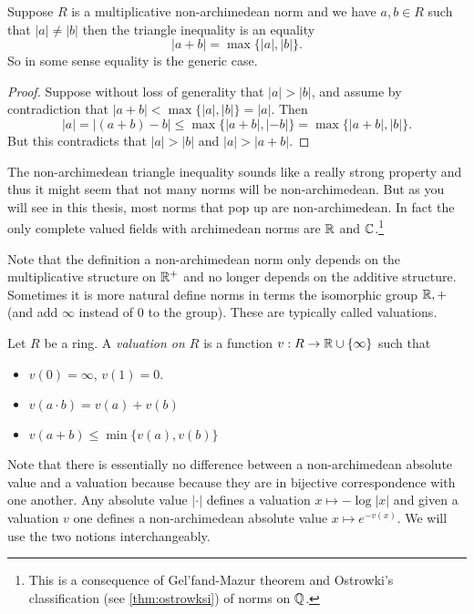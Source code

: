 \begin{remark}
	Suppose $R$ is a multiplicative non-archimedean norm and we have $a, b \in R$ such that $|a| \ne |b|$ then the triangle inequality is an equality \[
	|a + b| = \max \{|a|, |b|\} 
	.\] 
	So in some sense equality is the generic case. 
\end{remark}
\begin{proof}
	Suppose without loss of generality that  $|a| > |b|$, and assume by contradiction that $|a + b| < \max \{|a|, |b|\}  = |a|$. 
	Then \[
		|a| = |(a + b) - b| \le \max \{|a + b|, |- b|\} = \max \{|a + b|, |b|\}  
	.\] 
	But this contradicts that $|a| > |b|$ and $|a| > |a + b| $. 
\end{proof}
The non-archimedean triangle inequality sounds like a really strong property and thus it might seem that not many norms will be non-archimedean. 
But as you will see in this thesis, most norms that pop up are non-archimedean. 
In fact the only complete valued fields with archimedean norms are $\mathbb{R}$ and $\mathbb{C}$.\footnote{This is a consequence of Gel'fand-Mazur theorem and Ostrowki's classification (see \cref{thm:ostrowksi}) of norms on $\mathbb{Q}$.}



Note that the definition a non-archimedean norm only depends on the multiplicative structure on $\mathbb{R}^{+}$ and no longer depends on the additive structure. 
Sometimes it is more natural define norms in terms the isomorphic group $\mathbb{R}, +$ (and add $\infty$ instead of $0$ to the group). 
These are typically called valuations. 


\begin{definition}
	Let $R$ be a ring. A \emph{valuation on $R$} is a function $v:R \to \mathbb{R} \cup \{\infty\} $ such that 	
	\begin{itemize}
		\item $v(0) = \infty$, $v(1) = 0$. 
		\item $v(a\cdot b) = v(a) + v(b)$
		\item $v(a + b) \le \min\{v(a), v(b)\}$
	\end{itemize}
\end{definition}

\begin{remark}
	Note that there is essentially no difference between a non-archimedean absolute value and a valuation because because they are in bijective correspondence with one another.  Any absolute value $|\cdot |$ defines a valuation $x \mapsto -\log |x|$ and given a valuation $v$ one defines a non-archimedean absolute value $x\mapsto e^{- v(x)}$. 
	We will use the two notions interchangeably. 
\end{remark}


